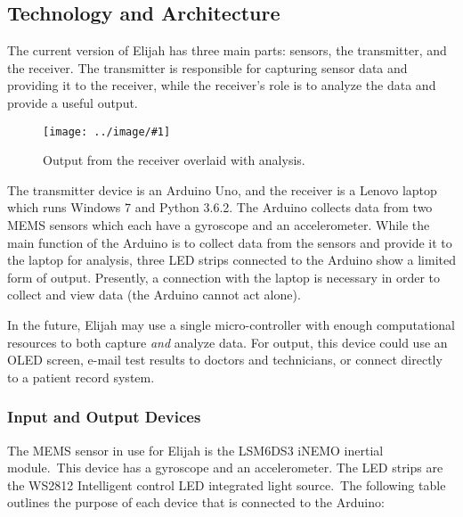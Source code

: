 \documentclass{article}
\newcommand{\img}[2]{
    \begin{center}
        \texttt{[image: ../image/\#1]}
    \end{center}    
}
\begin{document}
        \subsection{Technology and Architecture}
        The current version of Elijah has three main parts: sensors, the transmitter, and the receiver. The transmitter is responsible for capturing sensor data and providing it to the receiver, while the receiver's role is to analyze the data and provide a useful output.
        
        \begin{figure}
            \img{patient_x}{0.3}
            \caption*{Output from the receiver overlaid with analysis.}
        \end{figure}
        
        The transmitter device is an Arduino Uno, and the receiver is a Lenovo laptop which runs Windows 7 and Python 3.6.2. The Arduino collects data from two MEMS sensors which each have a gyroscope and an accelerometer. While the main function of the Arduino is to collect data from the sensors and provide it to the laptop for analysis, three LED strips connected to the Arduino show a limited form of output. Presently, a connection with the laptop is necessary in order to collect and view data (the Arduino cannot act alone).
        
        In the future, Elijah may use a single micro-controller with enough computational resources to both capture \textit{and} analyze data. For output, this device could use an OLED screen, e-mail test results to doctors and technicians, or connect directly to a patient record system.
        
            \subsubsection{Input and Output Devices}
            The MEMS sensor in use for Elijah is the LSM6DS3 iNEMO inertial module.\footnotemark\ This device has a gyroscope and an accelerometer. The LED strips are the WS2812 Intelligent control LED integrated light source.\footnotemark\ The following table outlines the purpose of each device that is connected to the Arduino:\newline
            
            
\end{document}
